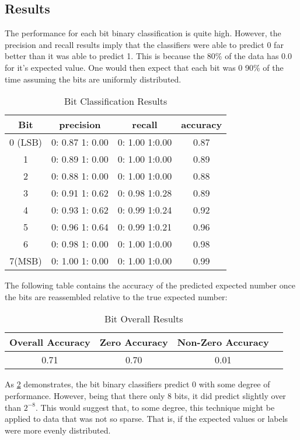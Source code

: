 \documentclass[pdftex,a4paper,11pt]{article}
\begin{document}
\subsection{Results}
The performance for each bit binary classification is quite high.  However, the precision and recall results imply that the classifiers were able to predict 0 far better than it was able to predict 1.  This is because the 80\% of the data has 0.0 for it's expected value.  One would then expect that each bit was $0$ 90\% of the time assuming the bits are uniformly distributed. 
\begin{table}[h]
{\centering
\begin{tabular}{|c|c|c|c|} \hline
	Bit 		&			precision				&		recall				&		accuracy			\\	\hline
0 (LSB)		&			0: 0.87	1: 0.00	&	0: 1.00	1:0.00	&		0.87	\\	\hline
1 				&			0: 0.89	1: 0.00	&	0: 1.00	1:0.00	&		0.89	\\	\hline
2 				&			0: 0.88	1: 0.00	&	0: 1.00	1:0.00	&		0.88	\\	\hline
3 				&			0: 0.91	1: 0.62	&	0: 0.98	1:0.28	&		0.89	\\	\hline
4 				&			0: 0.93	1: 0.62	&	0: 0.99	1:0.24	&		0.92	\\	\hline
5 				&			0: 0.96	1: 0.64	&	0: 0.99	1:0.21	&	  0.96	\\	\hline
6 				&			0: 0.98	1: 0.00	&	0: 1.00	1:0.00	&		0.98	\\	\hline
7(MSB) 		&			0: 1.00	1: 0.00	&	0: 1.00	1:0.00	&		0.99	\\	\hline
\end{tabular}
\caption{Bit Classification Results}          
\label{table:valresults}}
\end{table}

The following table contains the accuracy of the predicted expected number once the bits are reassembled relative to the true expected number:
\begin{table}[h]
{\centering 
\begin{tabular}{|c|c|c|c|} \hline
	Overall Accuracy 		&			Zero Accuracy				&		Non-Zero Accuracy		\\	\hline
		0.71							&					0.70						&				0.01					\\	\hline			
\end{tabular}
\caption{Bit Overall Results}          
\label{table:overallResults}}
\end{table}
As \ref{table:overallResults} demonstrates, the bit binary classifiers predict 0 with some degree of performance.   However, being that there only 8 bits, it did predict slightly over than $2^{-8}$.  This would suggest that, to some degree, this technique might be applied to data that was not so sparse.  That is, if the expected values or labels were more evenly distributed.  
\end{document}
